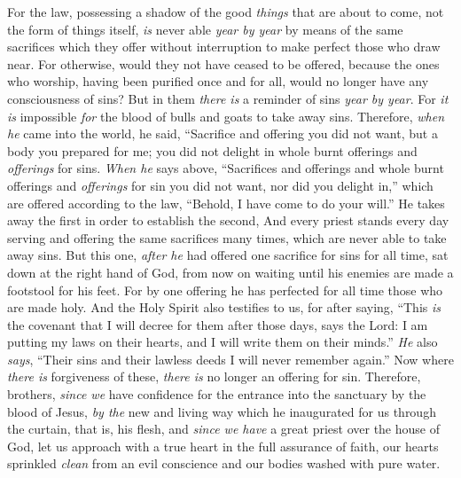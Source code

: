 \begin{biblechapter} %
 For the law, possessing a shadow of the good \textit{things} that are about to come, not the form of things itself, \textit{is} never able \textit{year by year} by means of the same sacrifices which they offer without interruption to make perfect those who draw near.
\verse For otherwise, would they not have ceased to be offered, because the ones who worship, having been purified once and for all, would no longer have any consciousness of sins?
\verse But in them \textit{there is} a reminder of sins \textit{year by year}.
\verse For \textit{it is} impossible \textit{for} the blood of bulls and goats to take away sins.
\verse Therefore, \textit{when he} came into the world, he said,
\verse “Sacrifice and offering you did not want, 
but a body you prepared for me;
\verse you did not delight in whole burnt offerings and \textit{offerings} for sins.
\verse \textit{When he} says above, “Sacrifices and offerings and whole burnt offerings and \textit{offerings} for sin 
you did not want, nor did you delight in,”
\verse which are offered according to the law, “Behold, I have come to do your will.”
\verse He takes away the first in order to establish the second,
\verse And every priest stands every day serving and offering the same sacrifices many times, which are never able to take away sins.
\verse But this one, \textit{after he} had offered one sacrifice for sins for all time, sat down at the right hand of God,
\verse from now on waiting until his enemies are made a footstool for his feet.
\verse For by one offering he has perfected for all time those who are made holy.
\verse And the Holy Spirit also testifies to us, for after saying,
\verse “This \textit{is} the covenant that I will decree for them 
after those days, says the Lord: 
I am putting my laws on their hearts, 
and I will write them on their minds.”
\verse \textit{He} also \textit{says}, “Their sins and their lawless deeds I will never remember again.”
\verse Now where \textit{there is} forgiveness of these, \textit{there is} no longer an offering for sin.
 Therefore, brothers, \textit{since we} have confidence for the entrance into the sanctuary by the blood of Jesus,
\verse \textit{by the} new and living way which he inaugurated for us through the curtain, that is, his flesh,
\verse and \textit{since we have} a great priest over the house of God,
\verse let us approach with a true heart in the full assurance of faith, our hearts sprinkled \textit{clean} from an evil conscience and our bodies washed with pure water.

\end{biblechapter}
